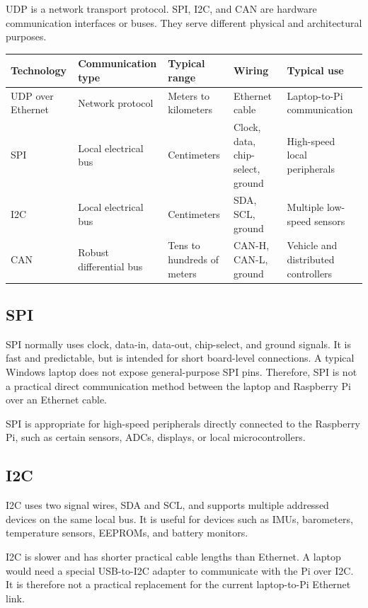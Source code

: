 \documentclass[11pt]{article}
\begin{document}
UDP is a network transport protocol. SPI, I2C, and CAN are hardware
communication interfaces or buses. They serve different physical and
architectural purposes.

\begin{center}
\begin{tabular}{p{} p{} p{} p{} p{}}
\toprule
Technology & Communication type & Typical range & Wiring & Typical use \\
\midrule
UDP over Ethernet & Network protocol & Meters to kilometers & Ethernet cable & Laptop-to-Pi communication \\
SPI & Local electrical bus & Centimeters & Clock, data, chip-select, ground & High-speed local peripherals \\
I2C & Local electrical bus & Centimeters & SDA, SCL, ground & Multiple low-speed sensors \\
CAN & Robust differential bus & Tens to hundreds of meters & CAN-H, CAN-L, ground & Vehicle and distributed controllers \\
\bottomrule
\end{tabular}
\end{center}

\subsection{SPI}

SPI normally uses clock, data-in, data-out, chip-select, and ground signals.
It is fast and predictable, but is intended for short board-level
connections. A typical Windows laptop does not expose general-purpose SPI
pins. Therefore, SPI is not a practical direct communication method between
the laptop and Raspberry Pi over an Ethernet cable.

SPI is appropriate for high-speed peripherals directly connected to the
Raspberry Pi, such as certain sensors, ADCs, displays, or local
microcontrollers.

\subsection{I2C}

I2C uses two signal wires, SDA and SCL, and supports multiple addressed
devices on the same local bus. It is useful for devices such as IMUs,
barometers, temperature sensors, EEPROMs, and battery monitors.

I2C is slower and has shorter practical cable lengths than Ethernet. A laptop
would need a special USB-to-I2C adapter to communicate with the Pi over I2C.
It is therefore not a practical replacement for the current laptop-to-Pi
Ethernet link.
\end{document}
